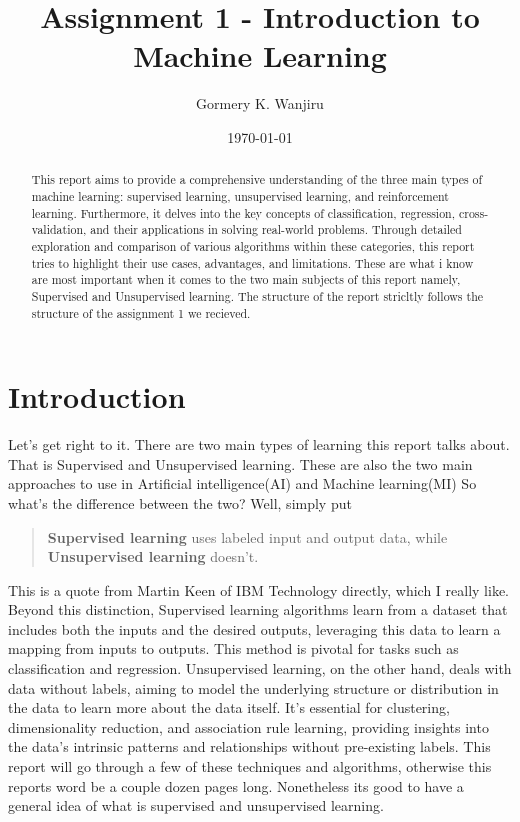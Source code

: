 \documentclass[11pt, a4paper]{article}
\title{Assignment 1 - Introduction to Machine Learning}
\author{Gormery K. Wanjiru}
\date{\today}
\begin{document}
\maketitle
\begin{abstract}
  This report aims to provide a comprehensive understanding of the three main types of machine learning: supervised learning, unsupervised learning, and reinforcement learning. Furthermore, it delves into the key concepts of classification, regression, cross-validation, and their applications in solving real-world problems. Through detailed exploration and comparison of various algorithms within these categories, this report tries to highlight their use cases, advantages, and limitations. These are what i know are most important when it comes to the two main subjects of this report namely, Supervised and Unsupervised learning.
  The structure of the report stricltly follows the structure of the assignment 1 we recieved.
\end{abstract}
  
\newpage
\tableofcontents
\newpage
\section{Introduction}
Let's get right to it. There are two main types of learning this report talks about. That is Supervised and Unsupervised learning. These are also the two main approaches to use in Artificial intelligence(AI) and Machine learning(MI) So what's the difference between the two? Well, simply put
\begin{quote}
\textbf{Supervised learning} uses labeled input and output data, while \textbf{Unsupervised learning} doesn't.
\end{quote}

This is a quote from Martin Keen of IBM Technology directly, which I really like. Beyond this distinction, Supervised learning algorithms learn from a dataset that includes both the inputs and the desired outputs, leveraging this data to learn a mapping from inputs to outputs. This method is pivotal for tasks such as classification and regression. Unsupervised learning, on the other hand, deals with data without labels, aiming to model the underlying structure or distribution in the data to learn more about the data itself. It's essential for clustering, dimensionality reduction, and association rule learning, providing insights into the data's intrinsic patterns and relationships without pre-existing labels.
This report will go through a few of these techniques and algorithms, otherwise  this reports word be a couple dozen pages long. Nonetheless its good to have a general idea of what is supervised and unsupervised learning.
\end{document}
